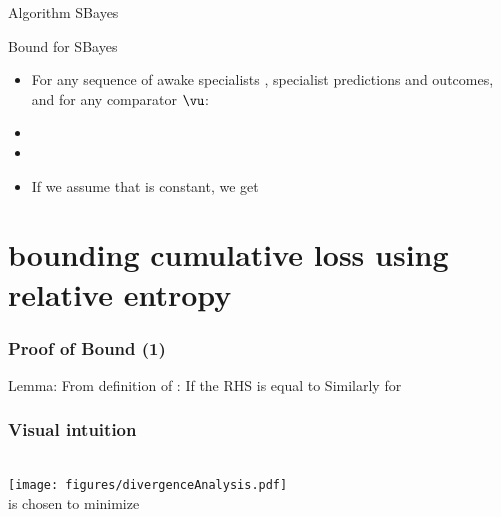 \documentclass{beamer}
\begin{document}
\begin{small}
\begin{frame}{Algorithm SBayes}
\end{frame}

\begin{frame}{Bound for SBayes}
\begin{itemize}
\item
  For any sequence of awake specialists , specialist predictions and outcomes, and for any comparator $\vu$:
\item {}
\item {}
\item If we assume that  is constant, we get
\R{\[
L_A \leq \sum_{t=1}^T \ell_{\vu}^t + \frac{\RE{\vu}{\vv^1}}{U}
\]} 
\end{itemize}
\end{frame}

\section{bounding cumulative loss using relative entropy}

\begin{frame}
  \frametitle{Proof of Bound (1)}
  Lemma:
  \R{\[
      \RE{\vu}{p_t} - \RE{\vu}{p_{t+1}}
      = u(E_t)L(\hat{y}_t,y_t) - \sum_{i \in E_t} u_i L(x_{t,i},y_t)
    \]}
  \pause
  From definition of \R{$\RE{}{}$}:
  \R{\[
      \RE{\vu}{p_t} - \RE{\vu}{p_{t+1}}
      = \sum_{i \in E_t} u_i \ln \frac{p_{t+1,i}}{p_{t,i}}
    \]}
  \pause
  If  the RHS is equal to
  \pause
  Similarly for 
\end{frame}

\begin{frame}
\frametitle{Visual intuition}

\pause \\
\texttt{[image: figures/divergenceAnalysis.pdf]}
\pause \\
 is chosen to minimize 


\end{frame}
\end{small}
\end{document}
